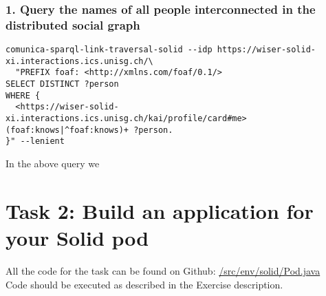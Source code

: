 \documentclass[11pt]{article}
\begin{document}
\subsubsection*{1. Query the names of all people interconnected in the distributed social graph}
\begin{lstlisting}
comunica-sparql-link-traversal-solid --idp https://wiser-solid-xi.interactions.ics.unisg.ch/\
  "PREFIX foaf: <http://xmlns.com/foaf/0.1/>
SELECT DISTINCT ?person
WHERE {
  <https://wiser-solid-xi.interactions.ics.unisg.ch/kai/profile/card#me> (foaf:knows|^foaf:knows)+ ?person.
}" --lenient 
\end{lstlisting}
In the above query we 
\section*{Task 2: Build an application for your Solid pod}
All the code for the task can be found on Github: \href{https://github.com/KaiTries/exercise-4/blob/main/src/env/solid/Pod.java}{/src/env/solid/Pod.java}\\
Code should be executed as described in the Exercise  description.
\end{document}
